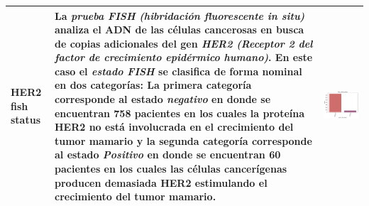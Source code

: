 \begin{table}[!htb]
	\footnotesize
	\begin{threeparttable}
		\begin{tabular}{p{2.5cm} p{7cm} p{6.5cm}} \toprule
			HER2 fish status
			& La \textit{prueba FISH (hibridación fluorescente in situ)} analiza el ADN de las células cancerosas en busca de copias adicionales del gen \textit{HER2 (Receptor 2 del factor de crecimiento epidérmico humano)}. En este caso el \textit{estado FISH} se clasifica de forma nominal en dos categorías: La primera categoría corresponde al estado \textit{negativo} en donde se encuentran 758 pacientes en los cuales la proteína HER2 no está involucrada en el crecimiento del tumor mamario y la segunda categoría corresponde al estado \textit{Positivo} en donde se encuentran 60 pacientes en los cuales las células cancerígenas producen demasiada HER2 estimulando el crecimiento del tumor mamario. 
			& \begin{center}\includegraphics[width=1\linewidth]{NOTEBOOK/IMAGENES_DESCRIPTIVAS/15_her_2_fish_status}\end{center}
			\\ \hline
			

\end{tabular}
\end{threeparttable}
\end{table}
